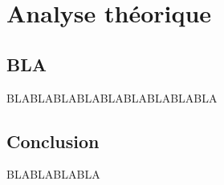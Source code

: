 \chapter{Analyse théorique}
\section{BLA}
BLABLABLABLABLABLABLABLABLA

\section{Conclusion}%
BLABLABLABLA


\clearpage


